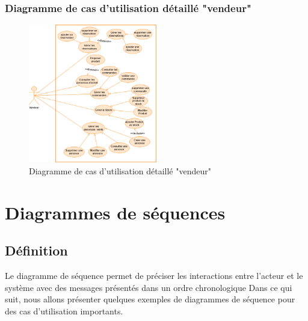 \documentclass[edit,12pt,a4paper,ChapStyle,oneside,doubleinterligne]{report}
\begin{document}
\subsubsection{Diagramme de cas d'utilisation détaillé "vendeur" }
\begin{figure}[h!]\label{fig:Diagramme de cas d'utilisation détaillé "vendeur"}
\centering
\includegraphics[width=0.5\textwidth]{images/diagramme de cas ven.png}
\caption{Diagramme de cas d'utilisation détaillé "vendeur"}
\end{figure}
\newpage
\section{Diagrammes de séquences}
\subsection{Définition}
Le diagramme de séquence permet de préciser les interactions entre l'acteur et le système avec des messages présentés dans un ordre chronologique 
\cite{séquences}
\newline Dans ce qui suit, nous allons présenter quelques exemples de diagrammes de séquence pour des cas d'utilisation importants.
\end{document}

